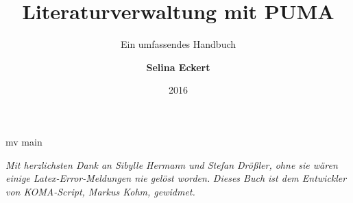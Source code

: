 mv main\documentclass[b5paper,11pt,twoside]{scrbook} %
\begin{document}
 
    \title{\Huge Literaturverwaltung mit PUMA}
    \subtitle{\Large Ein umfassendes Handbuch}
    \author{\textbf{Selina Eckert}}
    \date{2016}

\maketitle
\newpage
\textit{Mit herzlichsten Dank an Sibylle Hermann und Stefan Drößler, ohne sie wären einige Latex-Error-Meldungen nie gelöst worden.}\newline\newline
\textit{Dieses Buch ist dem Entwickler von KOMA-Script, Markus Kohm, gewidmet.}%
\clearpage
\tableofcontents 
\setcounter{secnumdepth}{3} 
\setcounter{tocdepth}{3} 
\newpage
{}
\pagestyle{headings}








 



\renewcommand{\indexname}{Stichwortverzeichnis}
\printindex
\end{document}
